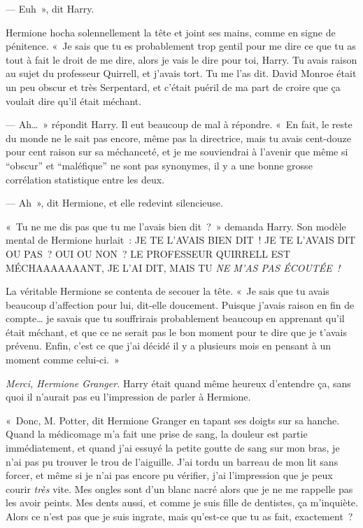 --- Euh~», dit Harry.

Hermione hocha solennellement la tête et joint ses mains, comme en signe de pénitence.
«~Je sais que tu es probablement trop gentil pour me dire ce que tu as tout à fait le droit de me dire, alors je vais le dire pour toi, Harry.
Tu avais raison au sujet du professeur Quirrell, et j'avais tort.
Tu me l'as dit.
David Monroe était un peu obscur et très Serpentard, et c'était puéril de ma part de croire que ça voulait dire qu'il était méchant.

--- Ah…~» répondit Harry.
Il eut beaucoup de mal à répondre.
«~En fait, le reste du monde ne le sait pas encore, même pas la directrice, mais tu avais cent-douze pour cent raison sur sa méchanceté, et je me souviendrai à l'avenir que même si “obscur” et “maléfique” ne sont pas synonymes, il y a une bonne grosse corrélation statistique entre les deux.

--- Ah~», dit Hermione, et elle redevint silencieuse.

«~Tu ne me dis pas que tu me l'avais bien dit~?~»
demanda Harry.
Son modèle mental de Hermione hurlait~: JE TE L'AVAIS BIEN DIT~!
JE TE L'AVAIS DIT OU PAS~?
OUI OU NON~?
LE PROFESSEUR QUIRRELL EST MÉCHAAAAAAANT, JE L'AI DIT, MAIS TU \emph{NE M'AS PAS ÉCOUTÉE~!}

La véritable Hermione se contenta de secouer la tête.
«~Je sais que tu avais beaucoup d'affection pour lui, dit-elle doucement.
Puisque j'avais raison en fin de compte… je savais que tu souffrirais probablement beaucoup en apprenant qu'il était méchant, et que ce ne serait pas le bon moment pour te dire que je t'avais prévenu.
Enfin, c'est ce que j'ai décidé il y a plusieurs mois en pensant à un moment comme celui-ci.~»

\emph{Merci, Hermione Granger.} Harry était quand même heureux d'entendre ça, sans quoi il n'aurait pas eu l'impression de parler à Hermione.

«~Donc, M. Potter, dit Hermione Granger en tapant ses doigts sur sa hanche.
Quand la médicomage m'a fait une prise de sang, la douleur est partie immédiatement, et quand j'ai essuyé la petite goutte de sang sur mon bras, je n'ai pas pu trouver le trou de l'aiguille.
J'ai tordu un barreau de mon lit sans forcer, et même si je n'ai pas encore pu vérifier, j'ai l'impression que je peux courir \emph{très} vite.
Mes ongles sont d'un blanc nacré alors que je ne me rappelle pas les avoir peints.
Mes dents aussi, et comme je suis fille de dentistes, ça m'inquiète.
Alors ce n'est pas que je suis ingrate, mais qu'est-ce que tu as fait, exactement~?

